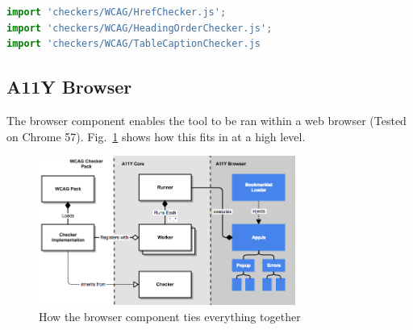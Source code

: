 \begin{lstlisting}[language=JavaScript]
import 'checkers/WCAG/HrefChecker.js';
import 'checkers/WCAG/HeadingOrderChecker.js';
import 'checkers/WCAG/TableCaptionChecker.js
\end{lstlisting}


\subsection{A11Y Browser}
The browser component enables the tool to be ran within a web browser (Tested
on Chrome 57). Fig.~\ref{fig:a11y_tool_browser_design} shows how this fits in
at a high level.

\begin{figure}[H]
\centering
\includegraphics[width=0.75\textwidth]{figures/a11y_tool_browser_design}
\captionsetup{justification=centering}
\caption{How the browser component ties everything together
\label{fig:a11y_tool_browser_design}}
\end{figure}


%
%
%
%
